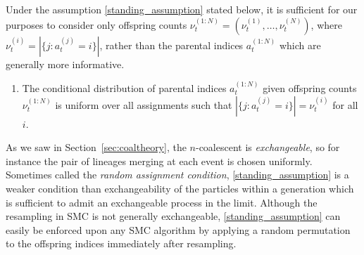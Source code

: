 Under the assumption \ref{standing_assumption} stated below, it is sufficient for our purposes to consider only offspring counts $\nu_t^{(1:N)} = (\nu_t^{(1)},\dots,\nu_t^{(N)})$, where $\nu_t^{(i)} = |\{ j: a_t^{(j)} =i \}|$, rather than the parental indices $a_t^{(1:N)}$ which are generally more informative.
\begin{enumerate}[label=(A\arabic*)]
\item\label{standing_assumption} The conditional distribution of parental indices $a_t^{(1:N)}$ given offspring counts $\nu_t^{(1:N)}$ is uniform over all assignments such that $ |\{ j: a_t^{(j)} =i \}|= \nu_t^{(i)} $ for all $i$.
\end{enumerate}
As we saw in Section~\ref{sec:coaltheory}, the $n$-coalescent is \emph{exchangeable}, so for instance the pair of lineages merging at each event is chosen uniformly. 
Sometimes called the \emph{random assignment condition},
\ref{standing_assumption} is a weaker condition than exchangeability of the particles within a generation which is sufficient to admit an exchangeable process in the limit.
Although the resampling in SMC is not generally exchangeable, %
\ref{standing_assumption} can easily be enforced upon any SMC algorithm by applying a random permutation to the offspring indices immediately after resampling.




